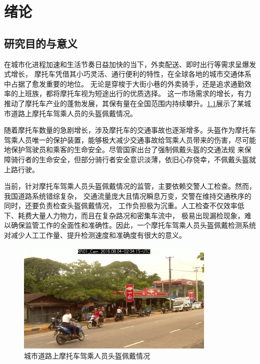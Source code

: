 
\chapter{绪论}

\section{研究目的与意义}

在城市化进程加速和生活节奏日益加快的当下，外卖配送、即时出行等需求呈爆发式增长，
摩托车凭借其小巧灵活、通行便利的特性，在全球各地的城市交通体系中占据了愈发重要的地位。
无论是穿梭于大街小巷的外卖骑手，还是追求通勤效率的上班族，都将摩托车视为短途出行的优质选择。
这一市场需求的增长，有力推动了摩托车产业的蓬勃发展，其保有量在全国范围内持续攀升。\ref{fig:traffic}展示了某城市道路上摩托车驾乘人员的头盔佩戴情况。

随着摩托车数量的急剧增长，涉及摩托车的交通事故也逐渐增多。头盔作为摩托车驾乘人员唯一的保护装置，能够极大减少交通事故给驾乘人员带来的伤害，尽可能地保护驾驶员和乘客的生命安全\cite{hss}。尽管国家出台了强制佩戴头盔的交通法规
来保障骑行者的生命安全，但部分骑行者安全意识淡薄，依旧心存侥幸，不佩戴头盔就上路行驶。

当前，针对摩托车驾乘人员头盔佩戴情况的监管，主要依赖交警人工检查。然而，我国道路系统错综复杂，
交通流量庞大且情况瞬息万变，交警在维持交通秩序的同时，还要负责检查头盔佩戴情况，
工作负担极为沉重。人工检查不仅效率低下、耗费大量人力物力，而且在复杂路况和密集车流中，
极易出现漏检现象，难以确保监管工作的全面性和准确性。因此，一个摩托车驾乘人员头盔佩戴检测系统对减少人工工作量、提升检测速度和准确度有很大的意义。

\begin{figure}[!htb]
  \centering
  \includegraphics[width=0.85\textwidth]{figs/chap01/traffic}
  \caption{城市道路上摩托车驾乘人员头盔佩戴情况}
  \label{fig:traffic}
\end{figure}

